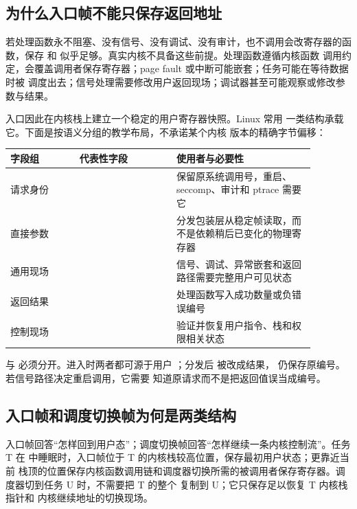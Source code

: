 \subsection{为什么入口帧不能只保存返回地址}

若处理函数永不阻塞、没有信号、没有调试、没有审计，也不调用会改寄存器的函数，保存
 和  似乎足够。真实内核不具备这些前提。处理函数遵循内核函数
调用约定，会覆盖调用者保存寄存器；page fault 或中断可能嵌套；任务可能在等待数据时被
调度出去；信号处理需要修改用户返回现场；调试器甚至可能观察或修改参数与结果。

入口因此在内核栈上建立一个稳定的用户寄存器快照。Linux 常用
 一类结构承载它。下面是按语义分组的教学布局，不承诺某个内核
版本的精确字节偏移：

\begin{longtable}{|L{0.20\linewidth}|L{0.28\linewidth}|L{0.40\linewidth}|}
\hline
字段组 & 代表性字段 & 使用者与必要性 \\ \hline
请求身份 &  & 保留原系统调用号，重启、seccomp、审计和 ptrace 需要它 \\ \hline
直接参数 &  & 分发包装层从稳定帧读取，而不是依赖稍后已变化的物理寄存器 \\ \hline
通用现场 &  & 信号、调试、异常嵌套和返回路径需要完整用户可见状态 \\ \hline
返回结果 &  & 处理函数写入成功数量或负错误编号 \\ \hline
控制现场 &  & 验证并恢复用户指令、栈和权限相关状态 \\ \hline
\end{longtable}

 与  必须分开。进入时两者都可源于用户 ；分发后
 被改成结果， 仍保存原编号。若信号路径决定重启调用，它需要
知道原请求而不是把返回值误当成编号。

\subsection{入口帧和调度切换帧为何是两类结构}

入口帧回答“怎样回到用户态”；调度切换帧回答“怎样继续一条内核控制流”。任务 T 在
 中睡眠时，入口帧位于 T 的内核栈较高位置，保存最初用户状态；更靠近当前
栈顶的位置保存内核函数调用链和调度器切换所需的被调用者保存寄存器。调度器切到任务 U
时，不需要把 T 的整个  复制到 U；它只保存足以恢复 T 内核栈指针和
内核继续地址的切换现场。

